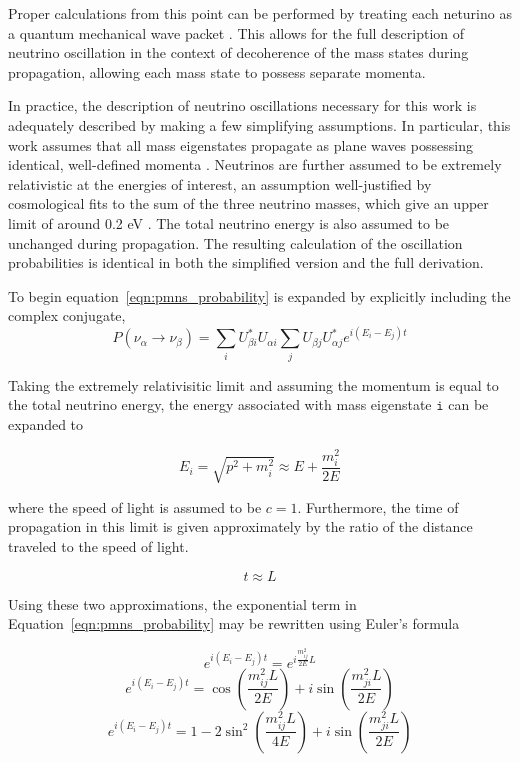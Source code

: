 Proper calculations from this point can be performed by treating each neturino as a quantum mechanical wave packet \cite{OscillationWavePackets}.
This allows for the full description of neutrino oscillation in the context of decoherence of the mass states during propagation, allowing each mass state to possess separate momenta.

In practice, the description of neutrino oscillations necessary for this work is adequately described by making a few simplifying assumptions.
In particular, this work assumes that all mass eigenstates propagate as plane waves possessing identical, well-defined momenta \cite{Review-PMNS}.
Neutrinos are further assumed to be extremely relativistic at the energies of interest, an assumption well-justified by cosmological fits to the sum of the three neutrino masses, which give an upper limit of around 0.2 eV \cite{PDG-2015}.
The total neutrino energy is also assumed to be unchanged during propagation.
The resulting calculation of the oscillation probabilities is identical in both the simplified version and the full derivation.

To begin equation~\ref{eqn:pmns_probability} is expanded by explicitly including the complex conjugate,  
\begin{equation}
P\left(\nu_\alpha\rightarrow\nu_\beta\right) =  \sum_i U^*_{\beta i} U_{\alpha i} \sum_j U_{\beta j} U^*_{\alpha j} e^{i \left(E_i-E_j\right) t} 
\label{eqn:pmns_probability_expanded}
\end{equation}

Taking the extremely relativisitic limit and assuming the momentum is equal to the total neutrino energy, the energy associated with mass eigenstate $\mathtt{i}$ can be expanded to

\begin{equation}
E_i = \sqrt{p^2 + m_i^2} \approx E +\frac{m_i^2}{2E} 
\end{equation}

where the speed of light is assumed to be $c=1$.
Furthermore, the time of propagation in this limit is given approximately by the ratio of the distance traveled to the speed of light.

\begin{equation}
t \approx L
\end{equation}

Using these two approximations, the exponential term in Equation~\ref{eqn:pmns_probability} may be rewritten using Euler's formula

\begin{equation}
 e^{i \left(E_i-E_j\right) t} = e^{i \frac{m_{ij}^2}{2E} L}
\end{equation}
\begin{equation}
 e^{i \left(E_i-E_j\right) t} = \cos\left(\frac{m_{ij}^2 L}{2E}\right) + i \sin\left(\frac{m_{ji}^2 L}{2E}\right)
\end{equation}
\begin{equation}
 e^{i \left(E_i-E_j\right) t} = 1 - 2\sin^2\left(\frac{m_{ij}^2 L}{4E}\right) + i \sin\left(\frac{m_{ji}^2 L}{2E}\right)
\end{equation}

